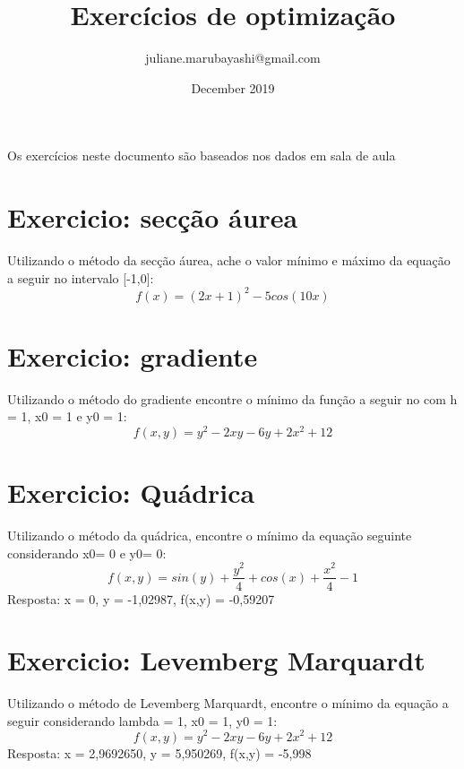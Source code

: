\documentclass{article}
\title{Exercícios de optimização}
\author{juliane.marubayashi@gmail.com}
\date{December 2019}
\begin{document}
\maketitle

Os exercícios neste documento são baseados nos dados em sala de aula
\section{Exercicio: secção áurea}
Utilizando o método da secção áurea, ache o valor mínimo e máximo da equação a seguir no intervalo [-1,0]:
$$ f(x) = (2x+1)^2 -5cos(10x)$$ 

\section{Exercicio: gradiente}
Utilizando o método do gradiente encontre o mínimo da função a seguir no com h = 1, x0 = 1 e y0 = 1: 
$$ f(x,y) = y^2 - 2xy - 6y + 2x^2 +12$$

\section{Exercicio: Quádrica}
Utilizando o método da quádrica, encontre o mínimo da equação seguinte considerando x0= 0 e y0= 0:
$$ f(x,y) = sin(y)+ \frac{y^2}{4} + cos(x) + \frac{x^2}{4} -1$$
Resposta: x = 0, y = -1,02987, f(x,y) = -0,59207

\section{Exercicio: Levemberg Marquardt}
Utilizando o método de Levemberg Marquardt, encontre o mínimo da equação a seguir considerando lambda = 1, x0 = 1, y0 = 1: 
$$ f(x,y) = y^2-2xy -6y +2x^2+12$$
Resposta: x = 2,9692650, y = 5,950269, f(x,y) = -5,998
\end{document}
